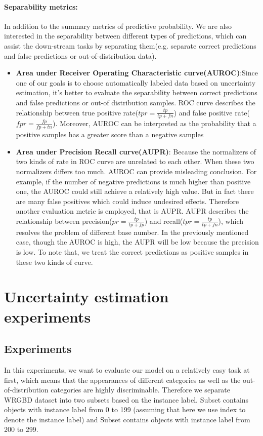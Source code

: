\paragraph{Separability metrics:} In addition to the summary metrics of predictive probability. We are also interested in the separability between different types of predictions, which can assist the down-stream tasks by separating them(e.g. separate correct predictions and false predictions or out-of-distribution data).
\begin{itemize}
	\item \textbf{Area under Receiver Operating Characteristic curve(AUROC)}:Since one of our goals is to choose automatically labeled data based on uncertainty estimation, it's better to evaluate the separability between correct predictions and false predictions or out-of distribution samples. ROC curve describes the relationship between true positive rate($tpr=\frac{tp}{tp+fn}$) and false positive rate($fpr=\frac{fp}{fp+tn}$). Moreover, AUROC can be interpreted as the probability that a positive samples has a greater score than a negative samples
	
	\item \textbf{Area under Precision Recall curve(AUPR)}: Because the normalizers of two kinds of rate in ROC curve are unrelated to each other. When these two normalizers differs too much. AUROC can provide misleading conclusion. For example, if the number of negative predictions is much higher than positive one, the AUROC could still achieve a relatively high value. But in fact there are many false positives which could induce undesired effects. Therefore another evaluation metric is employed, that is AUPR. AUPR describes the relationship between precision($pr = \frac{tp}{tp+fp}$) and recall($tpr=\frac{tp}{tp+fn}$), which resolves the problem of different base number. In the previously mentioned case, though the AUROC is high, the AUPR will be low because the precision is low. To note that, we treat the correct predictions as positive samples in these two kinds of curve.
\end{itemize}


\section{Uncertainty estimation experiments}

\subsection{Experiments }
In this experiments, we want to evaluate our model on a relatively easy task at first, which means that the appearances of different categories as well as the out-of-distribution categories are highly discriminable. Therefore we separate WRGBD dataset into two subsets based on the instance label. Subset  contains objects with instance label from 0 to 199 (assuming that here we use index to denote the instance label) and Subset  contains objects with instance label from 200 to 299. 

